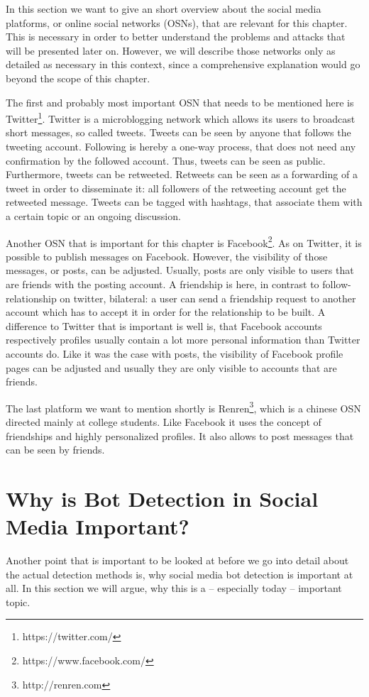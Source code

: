 In this section we want to give an short overview about the social media platforms, or online social networks (OSNs), that are relevant for this chapter. This is necessary in order to better understand the problems and attacks that will be presented later on. However, we will describe those networks only as detailed as necessary in this context, since a comprehensive explanation would go beyond the scope of this chapter.

The first and probably most important OSN that needs to be mentioned here is Twitter\footnote{https://twitter.com/}. Twitter is a microblogging network which allows its users to broadcast short messages, so called tweets. Tweets can be seen by anyone that follows the tweeting account. Following is hereby a one-way process, that does not need any confirmation by the followed account. Thus, tweets can be seen as public. Furthermore, tweets can be retweeted. Retweets can be seen as a forwarding of a tweet in order to disseminate it: all followers of the retweeting account get the retweeted message.  Tweets can be tagged with hashtags, that associate them with a certain topic or an ongoing discussion.

Another OSN that is important for this chapter is Facebook\footnote{https://www.facebook.com/}. As on Twitter, it is possible to publish messages on Facebook. However, the visibility of those messages, or posts, can be adjusted. Usually, posts are only visible to users that are friends with the posting account. A friendship is here, in contrast to follow-relationship on twitter, bilateral: a user can send a friendship request to another account which has to accept it in order for the relationship to be built. A difference to Twitter that is important is well is, that Facebook accounts respectively profiles usually contain a lot more personal information than Twitter accounts do. Like it was the case with posts, the visibility of Facebook profile pages can be adjusted and usually they are only visible to accounts that are friends.

The last platform we want to mention shortly is Renren\footnote{http://renren.com}, which is a chinese OSN directed mainly at college students. Like Facebook it uses the concept of friendships and highly personalized profiles. It also allows to post messages that can be seen by friends.

\section{Why is Bot Detection in Social Media Important?}
Another point that is important to be looked at before we go into detail about the actual detection methods is, why social media bot detection is important at all. In this section we will argue, why this is a -- especially today -- important topic. 


